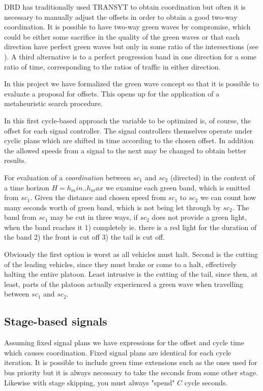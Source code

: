 DRD has traditionally used TRANSYT to obtain coordination but often it is necessary to manually adjust the offsets in order to obtain a good two-way coordination. It is possible to have two-way green waves by compromise, which could be either some sacrifice in the quality of the green waves or that each direction have perfect green waves but only in some ratio of the intersections (see \cite{artc}). A third alternative is to a perfect progression band in one direction for a some ratio of time, corresponding to the ratios of traffic in either direction.

In this project we have formalized the green wave concept so that it is possible to evaluate a proposal for offsets. This opens up for the application of a metaheuristic search procedure.

In this first cycle-based approach the variable to be optimized is, of course, the offset for each signal controller. The signal controllers themselves operate under cyclic plans which are shifted in time according to the chosen offset. In addition the allowed speeds from a signal to the next may be changed to obtain better results.

For evaluation of a \textit{coordination} between $sc_1$ and $sc_2$ (directed) in the context of a time horizon $H = h_min .. h_max$ we examine each green band, which is emitted from $sc_1$. Given the distance and chosen speed from $sc_1$ to $sc_2$ we can count how many seconds worth of green band, which is not being let through by $sc_2$. The band from $sc_1$ may be cut in three ways, if $sc_2$ does not provide a green light, when the band reaches it 1) completely ie. there is a red light for the duration of the band 2) the front is cut off 3) the tail is cut off.

Obviously the first option is worst as all vehicles must halt. Second is the cutting of the leading vehicles, since they must brake or come to a halt, effectively halting the entire platoon. Least intrusive is the cutting of the tail, since then, at least, parts of the platoon actually experienced a green wave when travelling between $sc_1$ and $sc_2$.

\subsection{Stage-based signals}

Assuming fixed signal plans we have expressions for the offset and cycle time which causes coordination. Fixed signal plans are identical for each cycle iteration. It is possible to include green time extensions such as the ones used for bus priority but it is always necessary to take the seconds from some other stage. Likewise with stage skipping, you must always "spend" $C$ cycle seconds.

